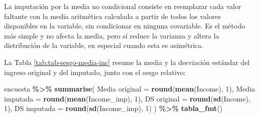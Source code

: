 \documentclass[
  spanish,
  12pt,
]{book}
\newenvironment{Shaded}{\begin{snugshade}}{\end{snugshade}}
\newcommand{\AttributeTok}[1]{\textcolor[rgb]{0.13,0.29,0.53}{#1}}
\newcommand{\ConstantTok}[1]{\textcolor[rgb]{0.56,0.35,0.01}{#1}}
\newcommand{\DecValTok}[1]{\textcolor[rgb]{0.00,0.00,0.81}{#1}}
\newcommand{\FunctionTok}[1]{\textcolor[rgb]{0.13,0.29,0.53}{\textbf{#1}}}
\newcommand{\NormalTok}[1]{#1}
\newcommand{\OtherTok}[1]{\textcolor[rgb]{0.56,0.35,0.01}{#1}}
\newcommand{\SpecialCharTok}[1]{\textcolor[rgb]{0.81,0.36,0.00}{\textbf{#1}}}
\newcommand{\StringTok}[1]{\textcolor[rgb]{0.31,0.60,0.02}{#1}}
\begin{document}
La imputación por la media no condicional consiste en reemplazar cada valor faltante con la media aritmética calculada a partir de todos los valores disponibles en la variable, sin condicionar en ninguna covariable. Es el método más simple y no afecta la media, pero sí reduce la varianza y altera la distribución de la variable, en especial cuando esta es asimétrica.

\begin{Shaded}
\end{Shaded}

La Tabla \ref{tab:tab-sesgo-media-inc} resume la media y la desviación estándar del ingreso original y del imputado, junto con el sesgo relativo:

\begin{Shaded}
\begin{Highlighting}[]
\NormalTok{encuesta }\SpecialCharTok{\%\textgreater{}\%}
  \FunctionTok{summarise}\NormalTok{(}
    \StringTok{\textasciigrave{}}\AttributeTok{Media original}\StringTok{\textasciigrave{}}    \OtherTok{=} \FunctionTok{round}\NormalTok{(}\FunctionTok{mean}\NormalTok{(Income), }\DecValTok{1}\NormalTok{),}
    \StringTok{\textasciigrave{}}\AttributeTok{Media imputada}\StringTok{\textasciigrave{}}    \OtherTok{=} \FunctionTok{round}\NormalTok{(}\FunctionTok{mean}\NormalTok{(Income\_imp), }\DecValTok{1}\NormalTok{),}
    \StringTok{\textasciigrave{}}\AttributeTok{DS original}\StringTok{\textasciigrave{}}       \OtherTok{=} \FunctionTok{round}\NormalTok{(}\FunctionTok{sd}\NormalTok{(Income), }\DecValTok{1}\NormalTok{),}
    \StringTok{\textasciigrave{}}\AttributeTok{DS imputada}\StringTok{\textasciigrave{}}       \OtherTok{=} \FunctionTok{round}\NormalTok{(}\FunctionTok{sd}\NormalTok{(Income\_imp), }\DecValTok{1}\NormalTok{)}
\NormalTok{  ) }\SpecialCharTok{\%\textgreater{}\%} \FunctionTok{tabla\_fmt}\NormalTok{()}
\end{Highlighting}
\end{Shaded}
\end{document}
